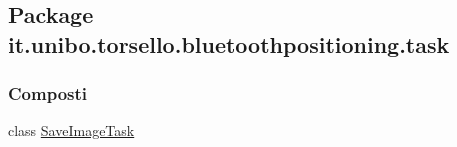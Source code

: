 \hypertarget{namespaceit_1_1unibo_1_1torsello_1_1bluetoothpositioning_1_1task}{}\subsection{Package it.\+unibo.\+torsello.\+bluetoothpositioning.\+task}
\label{namespaceit_1_1unibo_1_1torsello_1_1bluetoothpositioning_1_1task}
\subsubsection*{Composti}
\begin{DoxyCompactItemize}
\item 
class \hyperlink{classit_1_1unibo_1_1torsello_1_1bluetoothpositioning_1_1task_1_1SaveImageTask}{Save\+Image\+Task}
\end{DoxyCompactItemize}
